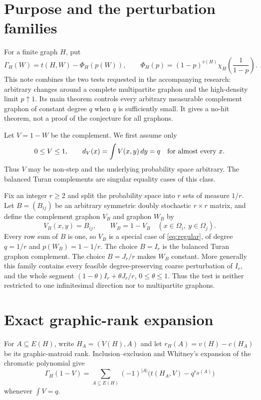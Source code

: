 \documentclass[11pt]{article}
\newcommand{\dd}{\,d}
\begin{document}
\section{Purpose and the perturbation families}

For a finite graph $H$, put
\[
 \Gamma_H(W)=t(H,W)-\Phi_H(p(W)),
 \qquad
 \Phi_H(p)=(1-p)^{v(H)}
 \chi_H\!\left(\frac1{1-p}\right).
\]
This note combines the two tests requested in the accompanying research:
arbitrary changes around a complete multipartite graphon and the
high-density limit $p\uparrow1$.  Its main theorem controls every arbitrary
measurable complement graphon of constant degree $q$ when $q$ is
sufficiently small.  It gives a no-hit theorem, not a proof of the
conjecture for all graphons.

Let $V=1-W$ be the complement.  We first assume only
\begin{equation}
 0\leq V\leq1,
 \qquad d_V(x)=\int V(x,y)\dd y=q
 \quad\hbox{for almost every }x.
 \label{eq:regular}
\end{equation}
Thus $V$ may be non-step and the underlying probability space arbitrary.
The balanced Turan complements are singular equality cases of this class.

Fix an integer $r\geq2$ and split the probability space into $r$ sets of
measure $1/r$.  Let $B=(B_{ij})$ be an arbitrary symmetric doubly stochastic
$r\times r$ matrix, and define the complement graphon $V_B$ and graphon
$W_B$ by
\[
 V_B(x,y)=B_{ij},\qquad W_B=1-V_B
 \quad (x\in\Omega_i,\ y\in\Omega_j).
\]
Every row sum of $B$ is one, so $V_B$ is a special case of
\eqref{eq:regular}, of degree
$q=1/r$ and $p(W_B)=1-1/r$.  The choice $B=I_r$ is the balanced Turan
graphon complement.  The choice $B=J_r/r$ makes $W_B$ constant.  More
generally this family contains every feasible degree-preserving coarse
perturbation of $I_r$, and the whole segment
$(1-\theta)I_r+\theta J_r/r$, $0\leq\theta\leq1$.  Thus the test is neither
restricted to one infinitesimal direction nor to multipartite graphons.

\section{Exact graphic-rank expansion}

For $A\subseteq E(H)$, write $H_A=(V(H),A)$ and let
$r_H(A)=v(H)-c(H_A)$ be its graphic-matroid rank.  Inclusion--exclusion and
Whitney's expansion of the chromatic polynomial give
\begin{equation}
 \Gamma_H(1-V)=
 \sum_{A\subseteq E(H)}(-1)^{|A|}
 \bigl(t(H_A,V)-q^{r_H(A)}\bigr)
 \label{eq:rank-expansion}
\end{equation}
whenever $\int V=q$.
\end{document}

